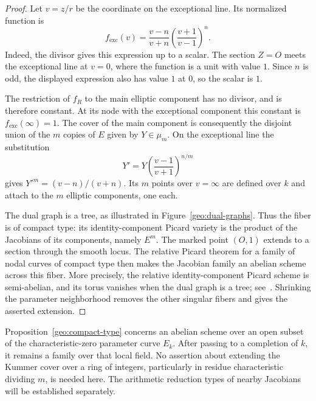 \begin{proof}
Let $v=z/r$ be the coordinate on the exceptional line.  Its normalized
function is
\begin{equation}\label{geo:exceptional-function}
 f_{\mathrm{exc}}(v)=
 \frac{v-n}{v+n}\left(\frac{v+1}{v-1}\right)^n.
\end{equation}
Indeed, the divisor gives this expression up to a scalar.  The section
$Z=O$ meets the exceptional line at $v=0$, where the function is a unit
with value $1$.  Since $n$ is odd, the displayed expression also has
value $1$ at $0$, so the scalar is $1$.

The restriction of $f_R$ to the main elliptic component has no divisor,
and is therefore constant.  At its node with the exceptional component
this constant is $f_{\mathrm{exc}}(\infty)=1$.  The cover of the main
component is consequently the disjoint union of the $m$ copies of $E$
given by $Y\in\mu_m$.  On the exceptional line the substitution
\[
 Y'=Y\left(\frac{v-1}{v+1}\right)^{n/m}
\]
gives $Y'^m=(v-n)/(v+n)$.  Its $m$ points over $v=\infty$ are defined
over $k$ and attach to the $m$ elliptic components, one each.

The dual graph is a tree, as illustrated in
Figure~\ref{geo:dual-graphs}.  Thus the fiber is of compact type: its
identity-component Picard variety is the product of the Jacobians of
its components, namely $E^m$.  The marked point $(O,1)$ extends to a
section through the smooth locus.  The relative Picard theorem for a family
of nodal curves of compact type then makes the Jacobian family an
abelian scheme across this fiber.  More precisely, the relative
identity-component Picard scheme is semi-abelian, and its torus vanishes
when the dual graph is a tree; see~\cite[Section~9.4, Theorem~1,
and Section~9.2, Proposition~10]{BLR}.  Shrinking the parameter neighborhood
removes the other singular fibers and gives the asserted extension.
\end{proof}

\begin{remark}\label{geo:characteristic-zero}
Proposition~\ref{geo:compact-type} concerns an abelian scheme over an
open subset of the characteristic-zero parameter curve $E_k$.  After
passing to a completion of $k$, it remains a family over that local
field.  No assertion about extending the Kummer cover over a ring of
integers, particularly in residue characteristic dividing $m$, is
needed here.  The arithmetic reduction types of nearby Jacobians
will be established separately.
\end{remark}

